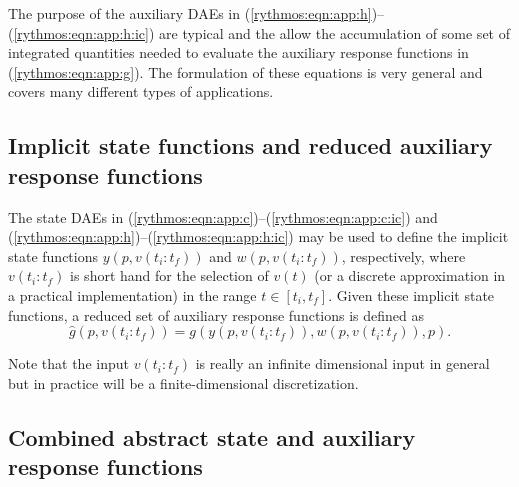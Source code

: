 \documentclass[pdf,ps2pdf,11pt]{SANDreport}
\begin{document}
The purpose of the auxiliary DAEs in
(\ref{rythmos:eqn:app:h})--(\ref{rythmos:eqn:app:h:ic}) are typical and the
allow the accumulation of some set of integrated quantities needed to evaluate
the auxiliary response functions in (\ref{rythmos:eqn:app:g}).  The
formulation of these equations is very general and covers many different types
of applications.

\subsection{Implicit state functions and reduced auxiliary response functions}

The state DAEs in (\ref{rythmos:eqn:app:c})--(\ref{rythmos:eqn:app:c:ic}) and
(\ref{rythmos:eqn:app:h})--(\ref{rythmos:eqn:app:h:ic}) may be used to define
the implicit state functions $y(p,v(t_i:t_f))$ and $w(p,v(t_i:t_f))$,
respectively, where $v(t_i:t_f)$ is short hand for the selection of $v(t)$ (or
a discrete approximation in a practical implementation) in the range
$t\in[t_i,t_f]$.  Given these implicit state functions, a reduced set of
auxiliary response functions is defined as
%
\begin{equation}
\hat{g}(p,v(t_i:t_f)) = g(y(p,v(t_i:t_f)),w(p,v(t_i:t_f)),p).
\label{rythmos:eqn:app:g_hat}
\end{equation}

Note that the input $v(t_i:t_f)$ is really an infinite dimensional
input in general but in practice will be a finite-dimensional discretization.

\subsection{Combined abstract state and auxiliary response functions}
\end{document}
